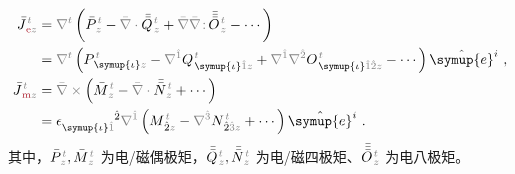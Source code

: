 \begin{subequations} \label{eq:J-em}
\begin{align}
	\bar{J}^{\;\!\mathcolor{gray}{t}}_{\;\!\textcolor{Maroon}{\text{e}}\mathcolor{gray}{z}} &= \mathcolor{gray}{\nabla^t} \left( \bar{P}^{\;\!\mathcolor{gray}{t}}_{\;\!\mathcolor{gray}{z}} - \mathcolor{gray}{\bar{\nabla} \cdot} \bar{\bar{Q}}^{\;\!\mathcolor{gray}{t}}_{\;\!\mathcolor{gray}{z}} + \mathcolor{gray}{\bar{\nabla}} \mathcolor{gray}{\bar{\nabla} \colon}\! \bar{\bar{\bar{O}}}^{\;\!\mathcolor{gray}{t}}_{\;\!\mathcolor{gray}{z}} - \cdots \right) \label{eq:J-e} \\ 
	&= \mathcolor{gray}{\nabla^t} \left( P^{\;\!\mathcolor{gray}{t}}_{\;\! \symup{\iota}\mathcolor{gray}{z}} - \mathcolor{gray}{\nabla^{\hat{1}}} Q^{\;\!\mathcolor{gray}{t}}_{\;\! \symup{\iota} \mathcolor{gray}{\hat{1}} \mathcolor{gray}{z}} + \mathcolor{gray}{\nabla^{\hat{1}}} \mathcolor{gray}{\nabla^{\hat{2}}} O^{\;\!\mathcolor{gray}{t}}_{\;\! \symup{\iota} \mathcolor{gray}{\hat{1}\hat{2}} \mathcolor{gray}{z}} - \cdots \right) \hat{\symup{e}}^i~, \label{eq:j-e} \\ 
	\bar{J}^{\;\!\mathcolor{gray}{t}}_{\;\!\textcolor{Maroon}{\text{m}}\mathcolor{gray}{z}} &= \mathcolor{gray}{\bar{\nabla} \times} \left( \bar{M}^{\;\!\mathcolor{gray}{t}}_{\;\!\mathcolor{gray}{z}} - \mathcolor{gray}{\bar{\nabla} \cdot} \bar{\bar{N}}^{\;\!\mathcolor{gray}{t}}_{\;\!\mathcolor{gray}{z}} + \cdots \right) \label{eq:J-m} \\ 
	&= \epsilon^{\hphantom{\symup{\iota}\hat{1}}\hat{2}}_{\symup{\iota}\mathcolor{gray}{\hat{1}}} \mathcolor{gray}{\nabla^{\hat{1}}} \left( M^{\;\!\mathcolor{gray}{t}}_{\;\! \hat{2}\mathcolor{gray}{z}} - \mathcolor{gray}{\nabla^{\hat{3}}} N^{\;\!\mathcolor{gray}{t}}_{\;\! \hat{2} \mathcolor{gray}{\hat{3}} \mathcolor{gray}{z}} + \cdots \right) \hat{\symup{e}}^i~. \label{eq:j-m}
\end{align}
\end{subequations}
其中，$\bar{P}^{\;\!\mathcolor{gray}{t}}_{\;\!\mathcolor{gray}{z}}, \bar{M}^{\;\!\mathcolor{gray}{t}}_{\;\!\mathcolor{gray}{z}}$ 为电/磁偶极矩，$\bar{\bar{Q}}^{\;\!\mathcolor{gray}{t}}_{\;\!\mathcolor{gray}{z}}, \bar{\bar{N}}^{\;\!\mathcolor{gray}{t}}_{\;\!\mathcolor{gray}{z}}$ 为电/磁四极矩、$\bar{\bar{\bar{O}}}^{\;\!\mathcolor{gray}{t}}_{\;\!\mathcolor{gray}{z}}$ 为电八极矩。

